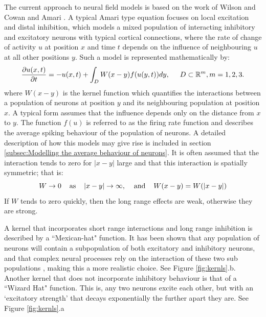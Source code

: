 \documentclass{uonmathreport}
\begin{document}
The current approach to neural field models is based on the work of Wilson and Cowan \cite{wilson1972excitatory,wilson1973mathematical} and Amari \cite{amari1975homogeneous,amari1977dynamics}. 
A typical Amari type equation focuses on local excitation and distal inhibition, which models a mixed population of interacting inhibitory and excitatory neurons with typical cortical connections, where the rate of change of activity $u$ at position $x$ and time $t$ depends on the influence of neighbouring $u$ at all other positions $y$. Such a model is represented mathematically by:
\begin{equation}\label{eqn:amari_nf}
\frac{\partial u(x,t)}{\partial t} = -u(x,t) + \int_{D} W(x - y)f(u(y,t))dy, \hspace{5mm} D \subset \mathbb{R}^m, m = 1,2,3.
\end{equation}
where $W(x - y)$ is the kernel function which quantifies the interactions between a population of neurons at position $y$ and its neighbouring population at position $x$. A typical form assumes that the influence depends only on the distance from $x$ to $y$. The function $f(u)$ is referred to as the firing rate function and describes the average spiking behaviour of the population of neurons. A detailed description of how this models may give rise is included in section \ref{subsec:Modelling the average behaviour of neurons}. It is often assumed that the interaction tends to zero for $|x - y|$ large and that this interaction is spatially symmetric; that is:
\begin{equation}
W \rightarrow 0 \hspace{4mm} \textnormal{as} \hspace{4mm} |x - y| \rightarrow \infty, \hspace{4mm} \textnormal{and} \hspace{4mm}W(x - y) = W(|x - y|)
\end{equation}
If $W$ tends to zero quickly, then the long range effects are weak, otherwise they are strong.

A kernel that incorporates short range interactions and long range inhibition is described by a ``Mexican-hat" function. It has been shown that any population of neurons will contain a subpopulation of both excitatory and inhibitory neurons, and that complex neural processes rely on the interaction of these two sub populations \cite{wilson1972excitatory}, making this a more realistic choice. See Figure \ref{fig:kernls}.b. Another kernel that does not incorporate inhibitory behaviour is that of a ``Wizard Hat" function. This is, any two neurons excite each other, but with an ‘excitatory strength’ that decays exponentially the further apart they are. See Figure \ref{fig:kernls}.a
\end{document}
